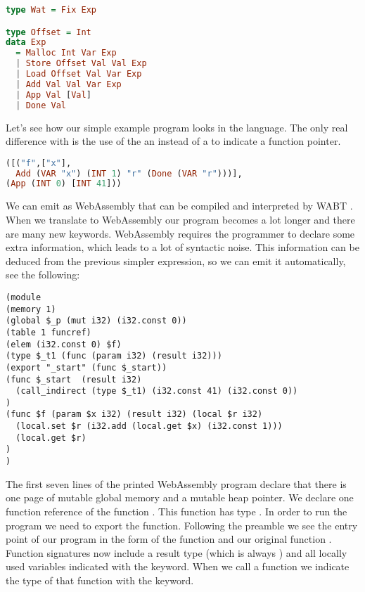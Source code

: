 {\begin{lstlisting}[language=Haskell]
type Wat = Fix Exp

type Offset = Int
data Exp
  = Malloc Int Var Exp
  | Store Offset Val Val Exp
  | Load Offset Val Var Exp
  | Add Val Val Var Exp
  | App Val [Val]
  | Done Val
\end{lstlisting}

Let's see how our simple example program looks in the  language. The only real difference with  is the use of the an  instead of a  to indicate a function pointer.

\begin{lstlisting}[language=Haskell]
([("f",["x"],
  Add (VAR "x") (INT 1) "r" (Done (VAR "r")))],
(App (INT 0) [INT 41]))
\end{lstlisting}

We can emit  as WebAssembly that can be compiled and interpreted by WABT \autocite{wabt}. When we translate to WebAssembly our program becomes a lot longer and there are many new keywords. WebAssembly requires the programmer to declare some extra information, which leads to a lot of syntactic noise. This information can be deduced from the previous simpler  expression, so we can emit it automatically, see the following:

\begin{lstlisting}
(module
(memory 1)
(global $_p (mut i32) (i32.const 0))
(table 1 funcref)
(elem (i32.const 0) $f)
(type $_t1 (func (param i32) (result i32)))
(export "_start" (func $_start))
(func $_start  (result i32)
  (call_indirect (type $_t1) (i32.const 41) (i32.const 0))
)
(func $f (param $x i32) (result i32) (local $r i32)
  (local.set $r (i32.add (local.get $x) (i32.const 1)))
  (local.get $r)
)
)
\end{lstlisting}

The first seven lines of the printed WebAssembly program declare that there is one page of mutable global memory and a mutable heap pointer. We declare one function reference of the function . This function has type . In order to run the program we need to export the  function. Following the preamble we see the entry point of our program in the form of the function  and our original function . Function signatures now include a result type (which is always ) and all locally used variables indicated with the  keyword. When we call a function we indicate the type of that function with the  keyword.

}

